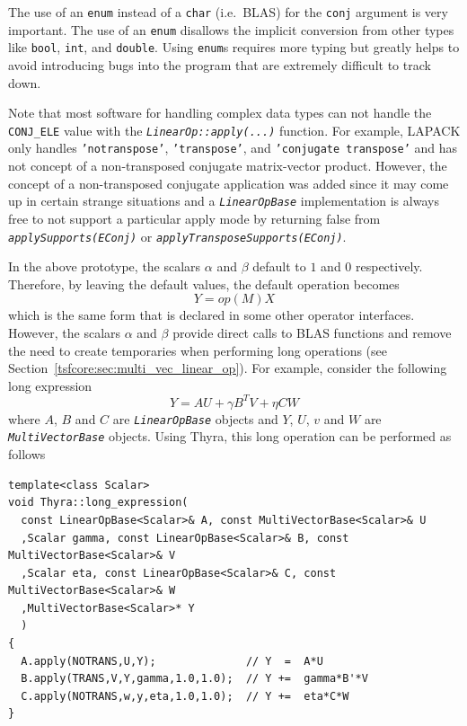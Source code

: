 \documentclass[pdf,ps2pdf,11pt]{SANDreport}
\begin{document}
The use of an {}\texttt{enum} instead of a {}\texttt{char} (i.e.\ BLAS) for
the {}\texttt{conj} argument is very important.  The use of an {}\texttt{enum}
disallows the implicit conversion from other types like {}\texttt{bool},
{}\texttt{int}, and {}\texttt{double}.  Using {}\texttt{enum}s requires more
typing but greatly helps to avoid introducing bugs into the program that are
extremely difficult to track down.

Note that most software for handling complex data types can not handle the
{}\texttt{CONJ\_ELE} value with the
{}\texttt{\textit{LinearOp\-::apply(\-...)}} function.  For example, LAPACK
only handles {}\texttt{'notranspose'}, {}\texttt{'transpose'}, and
{}\texttt{'conjugate transpose'} and has not concept of a non-transposed
conjugate matrix-vector product.  However, the concept of a non-transposed
conjugate application was added since it may come up in certain strange
situations and a {}\texttt{\textit{Linear\-Op\-Base}} implementation is always
free to not support a particular apply mode by returning false from
{}\texttt{\textit{applySupports(EConj)}} or
{}\texttt{\textit{applyTransposeSupports(EConj)}}.

In the above prototype, the scalars $\alpha$ and $\beta$ default to $1$ and
$0$ respectively.  Therefore, by leaving the default values, the default
operation becomes
%
\[
Y = op(M) X
\]
%
which is the same form that is declared in some other operator interfaces.
However, the scalars $\alpha$ and $\beta$ provide direct calls to BLAS
functions and remove the need to create temporaries when performing long
operations (see Section~\ref{tsfcore:sec:multi_vec_linear_op}).  For example,
consider the following long expression
%
\[
Y = A U + \gamma B^T V + \eta C W
\]
%
where $A$, $B$ and $C$ are {}\texttt{\textit{Linear\-Op\-Base}} objects and
$Y$, $U$, $v$ and $W$ are {}\texttt{\textit{Multi\-Vector\-Base}} objects.
Using Thyra, this long operation can be performed as follows

{\scriptsize\begin{verbatim}
template<class Scalar>
void Thyra::long_expression(
  const LinearOpBase<Scalar>& A, const MultiVectorBase<Scalar>& U
  ,Scalar gamma, const LinearOpBase<Scalar>& B, const MultiVectorBase<Scalar>& V
  ,Scalar eta, const LinearOpBase<Scalar>& C, const MultiVectorBase<Scalar>& W
  ,MultiVectorBase<Scalar>* Y
  )
{
  A.apply(NOTRANS,U,Y);              // Y  =  A*U
  B.apply(TRANS,V,Y,gamma,1.0,1.0);  // Y +=  gamma*B'*V
  C.apply(NOTRANS,w,y,eta,1.0,1.0);  // Y +=  eta*C*W
}
\end{verbatim}}
\end{document}
